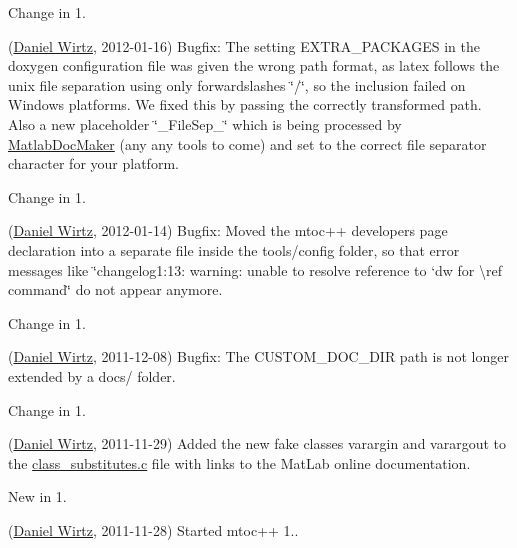 \begin{DoxyRefDesc}{Change in 1.}
\item[\hyperlink{changelog1_3__changelog1_3000022}{Change in 1.\+3}](\hyperlink{developers_dw}{Daniel Wirtz}, 2012-\/01-\/16) Bugfix\+: The setting {\ttfamily E\+X\+T\+R\+A\+\_\+\+P\+A\+C\+K\+A\+G\+E\+S} in the doxygen configuration file was given the wrong path format, as latex follows the unix file separation using only forwardslashes \char`\"{}/\char`\"{}, so the inclusion failed on Windows platforms. We fixed this by passing the correctly transformed path. Also a new placeholder \char`\"{}\+\_\+\+File\+Sep\+\_\+\char`\"{} which is being processed by \hyperlink{class_matlab_doc_maker}{Matlab\+Doc\+Maker} (any any tools to come) and set to the correct file separator character for your platform.\end{DoxyRefDesc}


\begin{DoxyRefDesc}{Change in 1.}
\item[\hyperlink{changelog1_3__changelog1_3000023}{Change in 1.\+3}](\hyperlink{developers_dw}{Daniel Wirtz}, 2012-\/01-\/14) Bugfix\+: Moved the mtoc++ developers page declaration into a separate file inside the tools/config folder, so that error messages like \char`\"{}changelog1\+:13\+: warning\+: unable to resolve reference to
 `dw\textquotesingle{} for \textbackslash{}ref command\char`\"{} do not appear anymore.\end{DoxyRefDesc}


\begin{DoxyRefDesc}{Change in 1.}
\item[\hyperlink{changelog1_3__changelog1_3000024}{Change in 1.\+3}](\hyperlink{developers_dw}{Daniel Wirtz}, 2011-\/12-\/08) Bugfix\+: The C\+U\+S\+T\+O\+M\+\_\+\+D\+O\+C\+\_\+\+D\+I\+R path is not longer extended by a {\ttfamily docs/} folder.\end{DoxyRefDesc}


\begin{DoxyRefDesc}{Change in 1.}
\item[\hyperlink{changelog1_3__changelog1_3000025}{Change in 1.\+3}](\hyperlink{developers_dw}{Daniel Wirtz}, 2011-\/11-\/29) Added the new fake classes varargin and varargout to the \hyperlink{class__substitutes_8c_source}{class\+\_\+substitutes.\+c} file with links to the Mat\+Lab online documentation.\end{DoxyRefDesc}


\begin{DoxyRefDesc}{New in 1.}
\item[\hyperlink{newfeat1_3__newfeat1_3000004}{New in 1.\+3}](\hyperlink{developers_dw}{Daniel Wirtz}, 2011-\/11-\/28) Started mtoc++ 1..\end{DoxyRefDesc}


